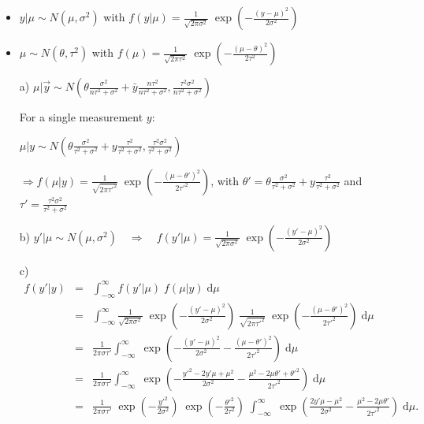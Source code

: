 \documentclass[fontsize=11pt,DIV=18,parskip=half]{scrartcl}
\begin{document}
\begin{itemize}
\item $y|\mu \sim N(\mu, \sigma^2)$ with $f(y|\mu) = \displaystyle{ \frac{1}{\sqrt{2\pi\sigma^2}} \; \exp\left(-\frac{(y-\mu)^2}{2\sigma^2}\right) }$
\item $\mu \sim N(\theta, \tau^2)$ with $f(\mu) = \displaystyle{ \frac{1}{\sqrt{2\pi\tau^2}} \; \exp\left(-\frac{(\mu-\theta)^2}{2\tau^2}\right) }$
\end{itemize}

\begin{enumerate}
\item[a)] $\mu|\vec{y} \sim \displaystyle{N\left(\theta \frac{\sigma^2}{n\tau^2 + \sigma^2} + \bar{y} \frac{n\tau^2}{n\tau^2 + \sigma^2}, \frac{\tau^2\sigma^2}{n\tau^2 + \sigma^2}\right)}$

\smallskip

For a single measurement $y$:

$\mu|y \sim \displaystyle{N\left(\theta \frac{\sigma^2}{\tau^2 + \sigma^2} + y \frac{\tau^2}{\tau^2 + \sigma^2}, \frac{\tau^2\sigma^2}{\tau^2 + \sigma^2}\right)}$

$\Rightarrow \displaystyle{f(\mu|y) = \frac{1}{\sqrt{2\pi\tau'^2}} \; \exp\left(-\frac{(\mu-\theta')^2}{2\tau'^2}\right)}$, with $\theta' = \theta \frac{\sigma^2}{\tau^2 + \sigma^2} + y \frac{\tau^2}{\tau^2 + \sigma^2}$ and $\tau'=\frac{\tau^2\sigma^2}{\tau^2 + \sigma^2}$


\item[b)] $y'|\mu \sim N\left(\mu,\sigma^2\right) \quad \Rightarrow \quad f(y'|\mu) =  \displaystyle{ \frac{1}{\sqrt{2\pi\sigma^2}} \; \exp\left(-\frac{(y'-\mu)^2}{2\sigma^2}\right) }$
\item[c)]
\begin{eqnarray*}
f(y'|y) &=& \int_{-\infty}^\infty f(y'|\mu) \; f(\mu|y) \; \text{d}\mu \\
&=& \int_{-\infty}^\infty \frac{1}{\sqrt{2\pi\sigma^2}} \; \exp\left(-\frac{(y'-\mu)^2}{2\sigma^2}\right) \; \frac{1}{\sqrt{2\pi\tau'^2}} \; \exp\left(-\frac{(\mu-\theta')^2}{2\tau'^2}\right) \; \text{d}\mu \\
&=& \frac{1}{2\pi\sigma\tau'} \int_{-\infty}^\infty  \; \exp\left(-\frac{(y'-\mu)^2}{2\sigma^2}-\frac{(\mu-\theta')^2}{2\tau'^2}\right) \; \text{d}\mu \\
&=& \frac{1}{2\pi\sigma\tau'} \int_{-\infty}^\infty  \; \exp\left(-\frac{y'^2-2y'\mu + \mu^2}{2\sigma^2}-\frac{\mu^2-2\mu\theta'+\theta'^2}{2\tau'^2}\right) \; \text{d}\mu \\
&=& \frac{1}{2\pi\sigma\tau'} \; \exp\left(-\frac{y'^2}{2\sigma^2}\right) \; \exp\left(-\frac{\theta'^2}{2\tau^2}\right) \; \int_{-\infty}^\infty  \; \exp\left(\frac{2y'\mu - \mu^2}{2\sigma^2}-\frac{\mu^2-2\mu\theta'}{2\tau'^2}\right) \; \text{d}\mu. \\
\end{eqnarray*}


\end{enumerate}
\end{document}
